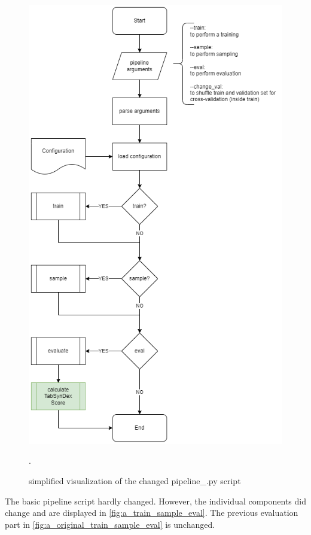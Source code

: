 \begin{figure}
	\centering
	\includegraphics[width=\textwidth, height=\textheight, keepaspectratio]{images/pipeline-CHANGED.png}
	\caption[Pipeline Script Changes]{simplified visualization of the changed pipeline\_\*.py script}
	\label{fig:a_pipeline_changed}.
\end{figure}
The basic pipeline script hardly changed.
However, the individual components did change and are displayed in \autoref{fig:a_train_sample_eval}.
The previous evaluation part in \autoref{fig:a_original_train_sample_eval} is unchanged.
